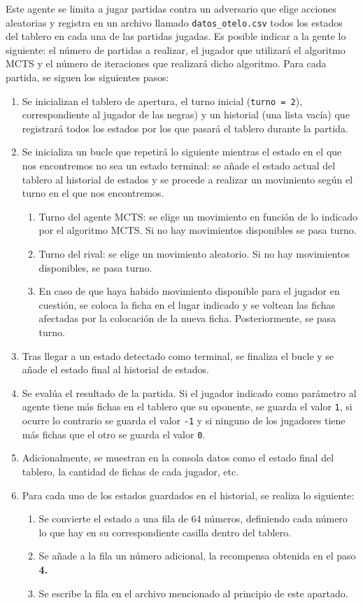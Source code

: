 \documentclass[conference]{IEEEtran}
\begin{document}
Este agente se limita a jugar partidas contra un adversario que elige acciones aleatorias y registra en un archivo llamado \texttt{datos\_otelo.csv} todos los estados del tablero en cada una de las partidas jugadas. Es posible indicar a la gente lo siguiente: el número de partidas a realizar, el jugador que utilizará el algoritmo MCTS y el número de iteraciones que realizará dicho algoritmo. Para cada partida, se siguen los siguientes pasos:

\begin{enumerate}
    \item Se inicializan el tablero de apertura, el turno inicial (\texttt{turno = 2}), correspondiente al jugador de las negras) y un historial (una lista vacía) que registrará todos los estados por los que pasará el tablero durante la partida.
    \item Se inicializa un bucle que repetirá lo siguiente mientras el estado en el que nos encontremos no sea un estado terminal: se añade el estado actual del tablero al historial de estados y se procede a realizar un movimiento según el turno en el que nos encontremos.
    \begin{enumerate}
        \item Turno del agente MCTS: se elige un movimiento en función de lo indicado por el algoritmo MCTS. Si no hay movimientos disponibles se pasa turno.
        \item Turno del rival: se elige un movimiento aleatorio. Si no hay movimientos disponibles, se pasa turno.
	    \item En caso de que haya habido movimiento disponible para el jugador en cuestión, se coloca la ficha en el lugar indicado y se voltean las fichas afectadas por la colocación de la nueva ficha. Posteriormente, se pasa turno.
    \end{enumerate}
    \item Tras llegar a un estado detectado como terminal, se finaliza el bucle y se añade el estado final al historial de estados.
    \item Se evalúa el resultado de la partida. Si el jugador indicado como parámetro al agente tiene más fichas en el tablero que su oponente, se guarda el valor \texttt{1}, si ocurre lo contrario se guarda el valor \texttt{-1} y si ninguno de los jugadores tiene más fichas que el otro se guarda el valor \texttt{0}.
    \item Adicionalmente, se muestran en la consola datos como el estado final del tablero, la cantidad de fichas de cada jugador, etc.
    \item Para cada uno de los estados guardados en el historial, se realiza lo siguiente:
    \begin{enumerate}
        \item Se convierte el estado a una fila de 64 números, definiendo cada número lo que hay en su correspondiente casilla dentro del tablero.
        \item Se añade a la fila un número adicional, la recompensa obtenida en el paso \textbf{4.}
	    \item Se escribe la fila en el archivo mencionado al principio de este apartado.
    \end{enumerate}
\end{enumerate}
\end{document}
